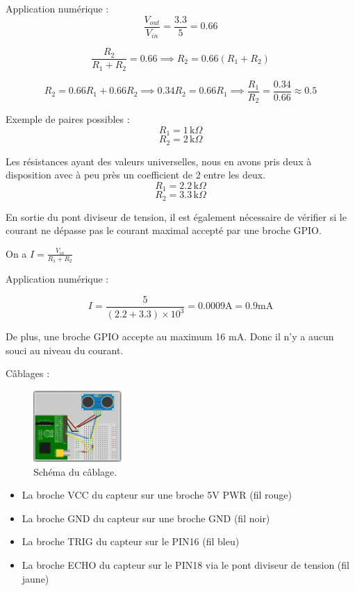 \documentclass[a4paper,12pt]{report}  %
\begin{document}
Application numérique : $$\frac{V_{out}}{V_{in}} = \frac{3.3}{5} = 0.66$$

$$\frac{R_2}{R_1 + R_2} = 0.66 \implies R_2 = 0.66 (R_1 + R_2)$$

$$R_2 = 0.66 R_1 + 0.66 R_2 \implies 0.34 R_2 = 0.66 R_1 \implies \frac{R_1}{R_2} = \frac{0.34}{0.66} \approx 0.5$$


Exemple de paires possibles : 
$$R_1 = 1 \, \mathrm{k}\Omega$$
$$R_2 = 2 \, \mathrm{k}\Omega$$

Les résistances ayant des valeurs universelles, 
nous en avons pris deux à disposition avec à peu près un coefficient de 2 entre les deux.
$$R_1 = 2.2 \, \mathrm{k}\Omega$$
$$R_2 = 3.3 \, \mathrm{k}\Omega$$

En sortie du pont diviseur de tension, il est également nécessaire de vérifier si le courant ne dépasse pas le courant maximal accepté par une broche GPIO. 

On a $I = \frac{V_{in}}{R_1 + R_2}$ 

Application numérique : 

$$I = \frac{5}{(2.2+3.3)\times10^3} = 0.0009 \mathrm{A} = 0.9 \mathrm{mA}$$

De plus, une broche GPIO accepte au maximum 16 mA. Donc il n’y a aucun souci au niveau du courant. 

Câblages : 

\begin{figure}[H]
	\centering
	\includegraphics[width=0.3\textwidth]{./attachments/capteur_ultrason_rpi.jpg}
	\caption{Schéma du câblage.}
	
\end{figure}

\begin{itemize}
	\item La broche VCC du capteur sur une broche 5V PWR (fil rouge)
	\item La broche GND du capteur sur une broche GND (fil noir)
	\item La broche TRIG du capteur sur le PIN16 (fil bleu)
	\item La broche ECHO du capteur sur le PIN18 via le pont diviseur de tension (fil jaune) 
\end{itemize}
\end{document}
